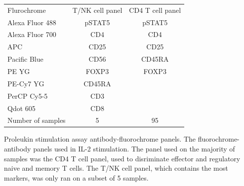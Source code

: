 

\begin{table}[h!]\footnotesize
\centering
\begin{tabularx}{.6\textwidth}{lcc}
\rowcolor{Gray}
Flurochrome       & T/NK cell panel & CD4 T cell panel   \\
Alexa Fluor 488   & pSTAT5          & pSTAT5             \\
Alexa Fluor 700   & CD4             & CD4                \\
APC               & CD25            & CD25               \\
Pacific Blue      & CD56            & CD45RA             \\
PE YG             & FOXP3           & FOXP3              \\
PE-Cy7 YG         & CD45RA          &                    \\
PerCP Cy5-5       & CD3             &                    \\
Qdot 605          & CD8             &                    \\
\hline
Number of samples &  5              & 95               \\
\end{tabularx}
{Proleukin stimulation assay antibody-fluorochrome panels.}
{
The fluorochrome-antibody panels used in IL-2 stimulation.
The panel used on the majority of samples was the CD4 T cell panel, used to disriminate
effector and regulatory naive and memory T cells.
The T/NK cell panel, which contains the most markers, was only ran on a subset of 5 samples.
}
\end{table}

